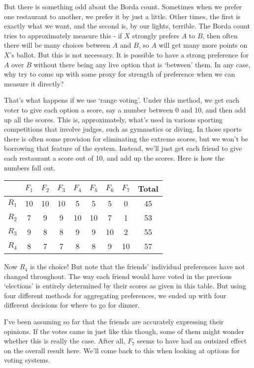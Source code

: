 \documentclass[11pt,]{article}
\begin{document}
But there is something odd about the Borda count. Sometimes when we
prefer one restaurant to another, we prefer it by just a little. Other
times, the first is exactly what we want, and the second is, by our
lights, terrible. The Borda count tries to approximately measure this -
if \(X\) strongly prefers \(A\) to \(B\), then often there will be many
choices between \(A\) and \(B\), so \(A\) will get many more points on
\(X\)'s ballot. But this is not necessary. It is possible to have a
strong preference for \(A\) over \(B\) without there being any live
option that is `between' them. In any case, why try to come up with some
proxy for strength of preference when we can measure it directly?

That's what happens if we use `range voting'. Under this method, we get
each voter to give each option a score, say a number between 0 and 10,
and then add up all the scores. This is, approximately, what's used in
various sporting competitions that involve judges, such as gymnastics or
diving. In those sports there is often some provision for eliminating
the extreme scores, but we won't be borrowing that feature of the
system. Instead, we'll just get each friend to give each restaurant a
score out of 10, and add up the scores. Here is how the numbers fall
out.

\begin{longtable}[]{@{}rcccccccc@{}}
\toprule
& \(F_1\) & \(F_2\) & \(F_3\) & \(F_4\) & \(F_5\) & \(F_6\) & \(F_7\) &
Total\tabularnewline
\midrule
\endhead
\(R_1\) & 10 & 10 & 10 & 5 & 5 & 5 & 0 & 45\tabularnewline
\(R_2\) & 7 & 9 & 9 & 10 & 10 & 7 & 1 & 53\tabularnewline
\(R_3\) & 9 & 8 & 8 & 9 & 9 & 10 & 2 & 55\tabularnewline
\(R_4\) & 8 & 7 & 7 & 8 & 8 & 9 & 10 & 57\tabularnewline
\bottomrule
\end{longtable}

Now \(R_4\) is the choice! But note that the friends' individual
preferences have not changed throughout. The way each friend would have
voted in the previous `elections' is entirely determined by their scores
as given in this table. But using four different methods for aggregating
preferences, we ended up with four different decisions for where to go
for dinner.

I've been assuming so far that the friends are accurately expressing
their opinions. If the votes came in just like this though, some of them
might wonder whether this is really the case. After all, \(F_7\) seems
to have had an outsized effect on the overall result here. We'll come
back to this when looking at options for voting systems.
\end{document}
